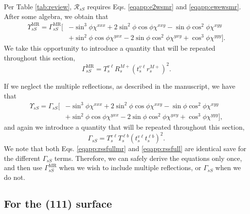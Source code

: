 Per Table \ref{tab:review}, $\mathcal{R}_{sS}$ requires Eqs.
\eqref{eqapp:e2wsmr} and \eqref{eqapp:ewewsmr}. After some algebra, we obtain
that
\begin{equation}\label{eqapp:rssfullmr}
\begin{split}
\Upsilon^{\mathrm{MR}}_{sS} = 
\Gamma^{\mathrm{MR}}_{sS}
\big[
&- \sin^{3}\phi\chi^{xxx}
 + 2\sin^{2}\phi\cos\phi\chi^{xxy}
 - \sin\phi\cos^{2}\phi\chi^{xyy}\\
&+ \sin^{2}\phi\cos\phi\chi^{yxx}
 - 2\sin\phi\cos^{2}\phi\chi^{yxy}
 + \cos^{3}\phi\chi^{yyy}
\big].
\end{split}
\end{equation}
We take this opportunity to introduce a quantity that will be repeated
throughout this section,
\begin{equation}\label{eqapp:gammassmr}
\Gamma^{\mathrm{MR}}_{sS} =
T_{s}^{v\ell}R^{M+}_{s}\left(t^{v\ell}_{s}r^{M+}_{s}\right)^{2}.
\end{equation}

If we neglect the multiple reflections, as described in the manuscript, we have
that
\begin{equation}\label{eqapp:rssfull}
\begin{split}
\Upsilon_{sS} =
\Gamma_{sS}
\big[
&- \sin^{3}\phi\chi^{xxx}
 + 2\sin^{2}\phi\cos\phi\chi^{xxy}
 - \sin\phi\cos^{2}\phi\chi^{xyy}\\
&+ \sin^{2}\phi\cos\phi\chi^{yxx}
 - 2\sin\phi\cos^{2}\phi\chi^{yxy}
 + \cos^{3}\phi\chi^{yyy}
\big],
\end{split}
\end{equation}
and again we introduce a quantity that will be repeated throughout this section,
\begin{equation}\label{eqapp:gammass}
\Gamma_{sS} =
T^{v\ell}_{s}T^{\ell b}_{s}\left(t^{v\ell}_{s}t^{\ell b}_{s}\right)^{2}.
\end{equation}
We note that both Eqs. \eqref{eqapp:rssfullmr} and \eqref{eqapp:rssfull} are identical
save for the different $\Gamma_{sS}$ terms. Therefore, we can safely derive the
equations only once, and then use $\Gamma^{\mathrm{MR}}_{sS}$ when we wish to
include multiple reflections, or $\Gamma_{sS}$ when we do not.


\subsection{For the (111) surface}

